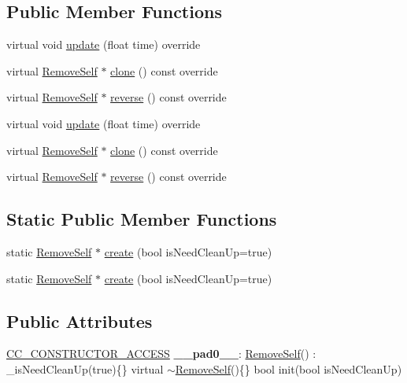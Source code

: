 \subsection*{Public Member Functions}
\begin{DoxyCompactItemize}
\item 
virtual void \hyperlink{classRemoveSelf_a362b4453b4b247e9b4b7e51fc1bd7c44}{update} (float time) override
\item 
virtual \hyperlink{classRemoveSelf}{Remove\+Self} $\ast$ \hyperlink{classRemoveSelf_abfb9c51cb63ea17adfdfc32dbe734984}{clone} () const override
\item 
virtual \hyperlink{classRemoveSelf}{Remove\+Self} $\ast$ \hyperlink{classRemoveSelf_a687363c6f0d38c4be9b797b76a505648}{reverse} () const override
\item 
virtual void \hyperlink{classRemoveSelf_ae77d0c282e5eba09f092ebec570fbc71}{update} (float time) override
\item 
virtual \hyperlink{classRemoveSelf}{Remove\+Self} $\ast$ \hyperlink{classRemoveSelf_a5e60946cc58193e98d2293c42e1c6d9d}{clone} () const override
\item 
virtual \hyperlink{classRemoveSelf}{Remove\+Self} $\ast$ \hyperlink{classRemoveSelf_a5bd57faed537125c8f7db63d9dad293f}{reverse} () const override
\end{DoxyCompactItemize}
\subsection*{Static Public Member Functions}
\begin{DoxyCompactItemize}
\item 
static \hyperlink{classRemoveSelf}{Remove\+Self} $\ast$ \hyperlink{classRemoveSelf_abd40e3eebd18907ec5b885bf2522ff77}{create} (bool is\+Need\+Clean\+Up=true)
\item 
static \hyperlink{classRemoveSelf}{Remove\+Self} $\ast$ \hyperlink{classRemoveSelf_a916d03f7a5c95c76f9450a3090d0b9ad}{create} (bool is\+Need\+Clean\+Up=true)
\end{DoxyCompactItemize}
\subsection*{Public Attributes}
\begin{DoxyCompactItemize}
\item 
\mbox{\label{classRemoveSelf_a8ec59e5645570db0838f6e42f90f84ae}} 
\hyperlink{_2cocos2d_2cocos_2base_2ccConfig_8h_a25ef1314f97c35a2ed3d029b0ead6da0}{C\+C\+\_\+\+C\+O\+N\+S\+T\+R\+U\+C\+T\+O\+R\+\_\+\+A\+C\+C\+E\+SS} {\bfseries \+\_\+\+\_\+pad0\+\_\+\+\_\+}\+: \hyperlink{classRemoveSelf}{Remove\+Self}() \+: \+\_\+is\+Need\+Clean\+Up(true)\{\} virtual $\sim$\hyperlink{classRemoveSelf}{Remove\+Self}()\{\} bool init(bool is\+Need\+Clean\+Up)
\end{DoxyCompactItemize}
